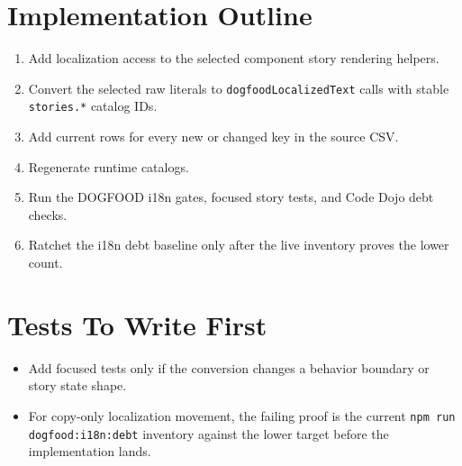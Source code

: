 \section{Implementation Outline}\label{record-197-implementation-outline}

\begin{enumerate}
\def\labelenumi{\arabic{enumi}.}
\tightlist
\item
  Add localization access to the selected component story rendering helpers.
\item
  Convert the selected raw literals to \texttt{d\allowbreak{}o\allowbreak{}g\allowbreak{}f\allowbreak{}o\allowbreak{}o\allowbreak{}d\allowbreak{}L\allowbreak{}o\allowbreak{}c\allowbreak{}a\allowbreak{}l\allowbreak{}i\allowbreak{}z\allowbreak{}e\allowbreak{}d\allowbreak{}T\allowbreak{}e\allowbreak{}x\allowbreak{}t} calls with stable \texttt{s\allowbreak{}t\allowbreak{}o\allowbreak{}r\allowbreak{}i\allowbreak{}e\allowbreak{}s\allowbreak{}.\allowbreak{}*} catalog IDs.
\item
  Add current rows for every new or changed key in the source CSV.
\item
  Regenerate runtime catalogs.
\item
  Run the DOGFOOD i18n gates, focused story tests, and Code Dojo debt checks.
\item
  Ratchet the i18n debt baseline only after the live inventory proves the lower count.
\end{enumerate}

\section{Tests To Write First}\label{record-197-tests-to-write-first}

\begin{itemize}
\tightlist
\item
  Add focused tests only if the conversion changes a behavior boundary or story state shape.
\item
  For copy-only localization movement, the failing proof is the current \texttt{n\allowbreak{}p\allowbreak{}m\allowbreak{} \allowbreak{}r\allowbreak{}u\allowbreak{}n\allowbreak{} \allowbreak{}d\allowbreak{}o\allowbreak{}g\allowbreak{}f\allowbreak{}o\allowbreak{}o\allowbreak{}d\allowbreak{}:\allowbreak{}i\allowbreak{}1\allowbreak{}8\allowbreak{}n\allowbreak{}:\allowbreak{}d\allowbreak{}e\allowbreak{}b\allowbreak{}t} inventory against the lower target before the implementation lands.
\end{itemize}


